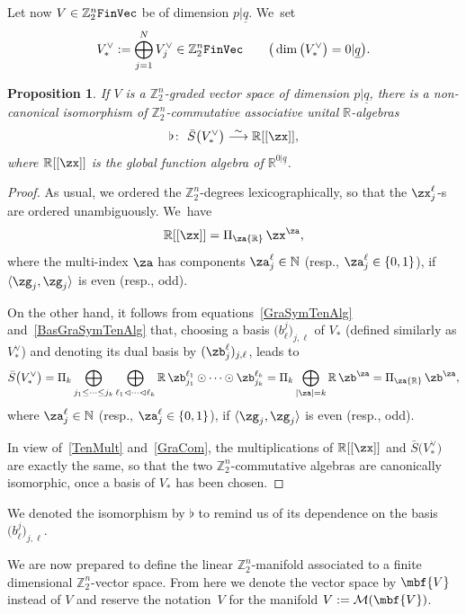 \documentclass[pdftex]{sigma}%
\newcommand{\op}[1]{\operatorname{#1}}
\newcommand{\R}{{\mathbb R}}
\newcommand{\Z}{{\mathbb Z}}
\def\ul{\underline}
\def\la{\langle}
\def\cM{\cal M}
\def\cM{\mathcal{M}}
\def\ul{\underline}
\newcommand{\0}{\otimes}
\numberwithin{equation}{section}
\newtheorem{Proposition}[Theorem]{Proposition}
 { \theoremstyle{definition}
\newtheorem{Definition}[Theorem]{Definition}
\newtheorem{Example}[Theorem]{Example}
\newtheorem{Remark}[Theorem]{Remark} }
\begin{document}
Let now $V\in\Z_2^n\tt FinVec$ be of dimension $p|\ul q$. We~set
\[
V^\vee_*:=\bigoplus_{j=1}^N V^\vee_{j}\in\Z_2^n{\tt FinVec}\qquad
\big(\op{dim}\big(V^\vee_*\big)=0|\ul q\big).
\]

\begin{Proposition}\label{NonCanIso}
If $V$ is a $\Z_2^n$-graded vector space of dimension $p|\ul q$, there is a non-canonical isomorphism of $\Z_2^n$-commutative associative unital $\R$-algebras
\begin{gather*}%
\flat\colon\ \bar{S}\big(V^\vee_*\big)\stackrel{\sim}{\longrightarrow}\R[[\zx]],
\end{gather*}
where $\R[[\zx]]$ is the global function algebra of $\R^{0|\ul q}$. \end{Proposition}

\begin{proof} As usual, we ordered the $\Z_2^n$-degrees lexicographically, so that the $\zx_j^\ell$-s are ordered unambiguously. We~have
\[
\R[[\zx]]=\Pi_\za\R\,\zx^\za,
\]
where the multi-index $\za$ has components $\za_j^\ell\in\mathbb{N}$ (resp., $\za_j^\ell\in\{0,1\}$), if $\la\zg_j,\zg_j\rangle$ is even (resp., odd).

On the other hand, it follows from equations~\eqref{GraSymTenAlg} and~\eqref{BasGraSymTenAlg} that, choosing a basis $\big(b^j_\ell\big)_{j,\ell}$ of $V_*$ (defined similarly as $V^\vee_*$) and denoting its dual basis by $(\zb^\ell_j)_{j,\ell}$, leads to
\begin{gather}\label{SBarBasis}
\bar S\big(V^\vee_*\big)=\Pi_k\bigoplus_{j_1\le\cdots\le j_k}\bigoplus_{\ell_1\lhd\cdots\lhd \ell_k}\R\,\zb_{j_1}^{\ell_1}\odot\cdots\odot \zb_{j_k}^{\ell_k}=\Pi_k\bigoplus_{|\za|=k}\R\,\zb^\za=\Pi_\za\R\,\zb^\za,
\end{gather}
where $\za_j^\ell\in\mathbb{N}$ (resp., $\za_j^\ell\in\{0,1\}$), if $\la\zg_j,\zg_j\rangle$ is even (resp., odd).

In view of~\eqref{TenMult} and~\eqref{GraCom}, the multiplications of $\R[[\zx]]$ and $\bar S\big(V^\vee_*\big)$ are exactly the same, so that the two $\Z_2^n$-commutative algebras are canonically isomorphic, once a basis of $V_*$ has been chosen.
\end{proof}

\begin{Remark}
We denoted the isomorphism by $\flat$ to remind us of its dependence on the basis~$\big(b^j_\ell\big)_{j,\ell}$.
\end{Remark}

We are now prepared to define the linear $\Z_2^n$-manifold associated to a finite dimensional $\Z_2^n$-vector space. From here we denote the vector space by $\mbf{V}$ instead of $V$ and reserve the notation~$V$ for the manifold $V:=\cM(\mbf{V})$.
\end{document}
